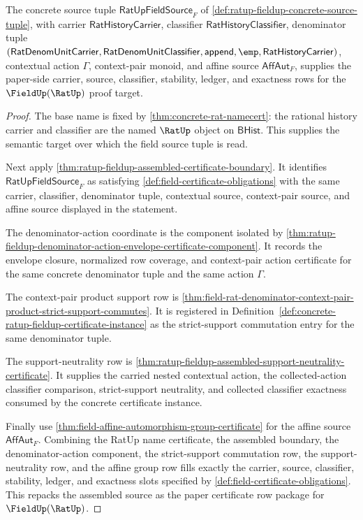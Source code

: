 \begin{theorem}
\label{thm:ratup-fieldup-semantic-namecert}
The concrete source tuple $\mathsf{RatUpFieldSource}_F$ of
\autoref{def:ratup-fieldup-concrete-source-tuple}, with carrier
$\mathsf{RatHistoryCarrier}$, classifier $\mathsf{RatHistoryClassifier}$,
denominator tuple
$(\mathsf{RatDenomUnitCarrier},\mathsf{RatDenomUnitClassifier},
\mathsf{append},\emp,\mathsf{RatHistoryCarrier})$, contextual action
$\Gamma$, context-pair monoid, and affine source $\mathsf{AffAut}_F$,
supplies the paper-side carrier, source, classifier, stability, ledger, and
exactness rows for the $\FieldUp(\RatUp)$ proof target.
\end{theorem}
\begin{proof}
The base name is fixed by \autoref{thm:concrete-rat-namecert}: the rational
history carrier and classifier are the named $\RatUp$ object on $\mathsf{BHist}$.
This supplies the semantic target over which the field source tuple is read.

Next apply \autoref{thm:ratup-fieldup-assembled-certificate-boundary}. It
identifies $\mathsf{RatUpFieldSource}_F$ as satisfying
\autoref{def:field-certificate-obligations} with the same carrier,
classifier, denominator tuple, contextual source, context-pair source, and
affine source displayed in the statement.

The denominator-action coordinate is the component isolated by
\autoref{thm:ratup-fieldup-denominator-action-envelope-certificate-component}.
It records the envelope closure, normalized row coverage, and context-pair
action certificate for the same concrete denominator tuple and the same action
$\Gamma$.

The context-pair product support row is
\autoref{thm:field-rat-denominator-context-pair-product-strict-support-commutes}.
It is registered in
Definition~\ref{def:concrete-ratup-fieldup-certificate-instance} as the
strict-support commutation entry for the same denominator tuple.

The support-neutrality row is
\autoref{thm:ratup-fieldup-assembled-support-neutrality-certificate}. It
supplies the carried nested contextual action, the collected-action classifier
comparison, strict-support neutrality, and collected classifier exactness
consumed by the concrete certificate instance.

Finally use \autoref{thm:field-affine-automorphism-group-certificate} for the
affine source $\mathsf{AffAut}_F$. Combining the RatUp name certificate, the
assembled boundary, the denominator-action component, the strict-support
commutation row, the support-neutrality row, and the affine group row fills
exactly the carrier, source, classifier, stability, ledger, and exactness slots
specified by
\autoref{def:field-certificate-obligations}. This repacks the assembled source
as the paper certificate row package for $\FieldUp(\RatUp)$.
\end{proof}

